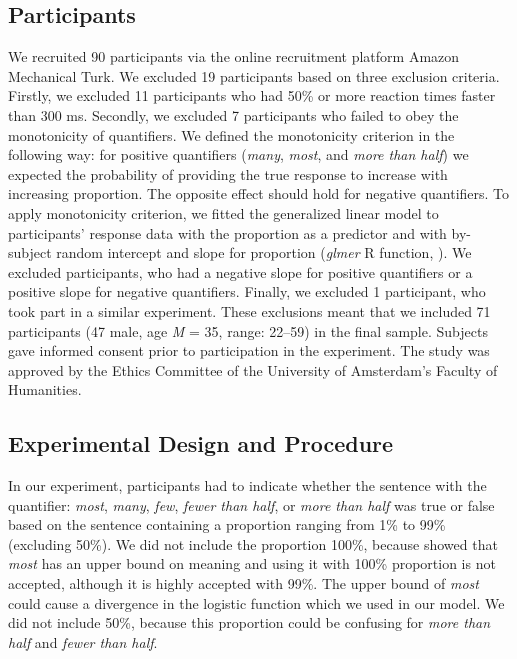 \documentclass{article}
\begin{document}
\subsection{Participants}
We recruited 90 participants via the online recruitment platform Amazon Mechanical Turk. %
We excluded 19 participants based on three exclusion criteria. Firstly, we excluded 11 participants who had 50\% or more reaction times faster than 300 ms. Secondly, we excluded 7 participants who failed to obey the monotonicity of quantifiers. We defined the monotonicity criterion in the following way: for positive quantifiers (\textit{many}, \textit{most}, and \textit{more than half}) we expected the probability of providing the true response to increase with increasing proportion. The opposite effect should hold for negative quantifiers. To apply monotonicity criterion, we fitted the generalized linear model to participants' response data with the proportion as a predictor and with by-subject random intercept and slope for proportion (\textit{glmer} R function, ). We excluded participants, who had a negative slope for positive quantifiers or a positive slope for negative quantifiers. Finally, we excluded 1 participant, who took part in a similar experiment. These exclusions meant that we included 71 participants (47 male, age \textit{M} = 35, range: 22--59) in the final sample. Subjects gave informed consent prior to participation in the experiment. The study was approved by the Ethics Committee of the University of Amsterdam's Faculty of Humanities.

\subsection{Experimental Design and Procedure}
In our experiment, participants had to indicate whether the sentence with the quantifier: \textit{most}, \textit{many}, \textit{few}, \textit{fewer than half}, or \textit{more than half} was true or false based on the sentence containing a proportion ranging from 1\% to 99\% (excluding 50\%). We did not include the proportion 100\%, because  showed that \textit{most} has an upper bound on meaning and using it with 100\% proportion is not accepted, although it is highly accepted with 99\%. The upper bound of \textit{most} could cause a divergence in the logistic function which we used in our model. We did not include 50\%, because this proportion could be confusing for \textit{more than half} and \textit{fewer than half}.
\end{document}

